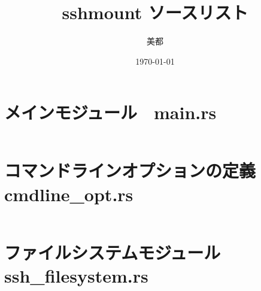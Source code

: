 \documentclass[paper=a4paper, fontsize=10pt, head_space=10mm, foot_space=17mm, gutter=17mm, line_length=185mm, twoside]{jlreq}
\title{sshmount ソースリスト}
\author{美都}
\date{\today}
\begin{document}
\maketitle
\tableofcontents
\clearpage

\section{メインモジュール　main.rs}
\inputminted[linenos, breaklines]{rust}{src/main.rs}
\clearpage

\section{コマンドラインオプションの定義 cmdline\_opt.rs}
\inputminted[linenos, breaklines]{rust}{src/cmdline_opt.rs}
\clearpage

\section{ファイルシステムモジュール ssh\_filesystem.rs}
\inputminted[linenos, breaklines]{rust}{src/ssh_filesystem.rs}
\end{document}
